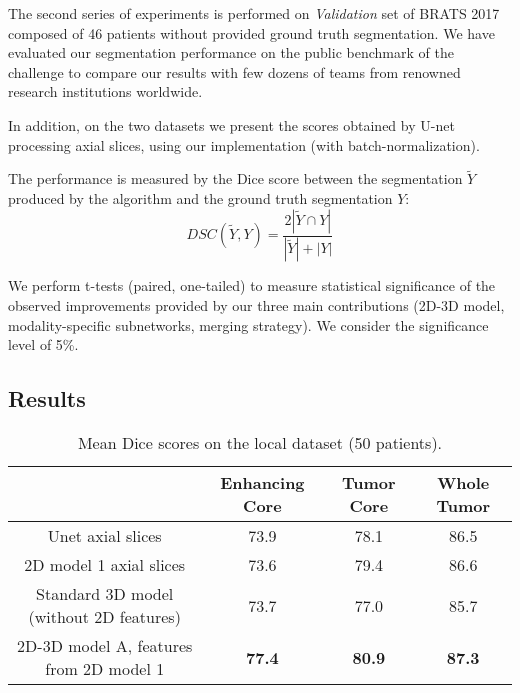 \documentclass[preprint,12pt]{elsarticle}
\begin{document}
The second series of experiments is performed on \textit{Validation} set of BRATS 2017 composed of 46 patients without provided ground truth segmentation. We have evaluated our segmentation performance on the public benchmark of the challenge to compare our results with few dozens of teams from renowned research institutions worldwide.

In addition, on the two datasets we present the scores obtained by U-net processing axial slices, using our implementation (with batch-normalization).

The performance is measured by the Dice score between the segmentation $\tilde{Y}$ produced by the algorithm and the ground truth segmentation $Y$:
\begin{equation}
 DSC(\tilde{Y}, Y)= \frac{2 |\tilde{Y} \cap Y|}{|\tilde{Y}|+|Y|}
\end{equation}










We perform t-tests (paired, one-tailed) to measure statistical significance of the observed improvements provided by our three main contributions (2D-3D model, modality-specific subnetworks, merging strategy). We consider the significance level of 5\%.







\subsection{Results}



\begin{table}[ht!]
\centering
\caption{Mean Dice scores on the local dataset (50 patients).}
\begin{tabular}{|c|c|c|c|}
  \hline 
& \scriptsize{Enhancing Core}& \scriptsize{Tumor Core}& \scriptsize{Whole Tumor}\\ 
\hline
\scriptsize{Unet axial slices}& \scriptsize{ 73.9   }& \scriptsize{78.1}& \scriptsize{ 86.5  }\\ 
  \hline
\scriptsize{2D model 1 axial slices}& \scriptsize{  73.6 }& \scriptsize{ 79.4}& \scriptsize{ 86.6  }\\ 
  \hline
\scriptsize{Standard 3D model (without 2D features)}& \scriptsize{ 73.7 }& \scriptsize{ 77.0  }& \scriptsize{ 85.7  }\\ 
  \hline
\scriptsize{2D-3D model A, features from 2D model 1}& \scriptsize{ \textbf{77.4} }& \scriptsize{ \textbf{80.9} }& \scriptsize{ \textbf{87.3}   }\\ 
  \hline
\end{tabular}
\label{table_results}
\end{table}
\end{document}

